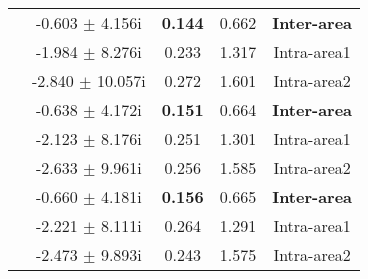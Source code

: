 \documentclass[conference,11pt]{IEEEtran}
\begin{document}
\begin{table}[t]
\begin{tabular}{||c|c|c|c|c||}
{}       &      {}     &         {} &      {}     &       {} \\ \hline
\hline
\multirow{3}{*}{\centering {10\%WG}}    &-0.603	$\pm$ 4.156i&	\bf{0.144}&	0.662& \bf{Inter-area}\\ 
{}                           &-1.984	$\pm$ 8.276i&	0.233&	1.317& Intra-area1\\
{}                            &-2.840	$\pm$ 10.057i&	0.272&	1.601& Intra-area2\\ \hline
\multirow{3}{*}{\centering {25\%WG}}    &-0.638	$\pm$ 4.172i&	\bf{0.151}&	0.664& \bf{Inter-area}\\ 
{}                            &-2.123	$\pm$ 8.176i&	0.251&	1.301& Intra-area1\\
{}                           &-2.633	$\pm$ 9.961i&	0.256&	1.585& Intra-area2\\ \hline
\multirow{3}{*}{\centering {35\%WG}}    &-0.660	$\pm$ 4.181i&	\bf{0.156}&	0.665& \bf{Inter-area}\\
{}                           &-2.221	$\pm$ 8.111i&	0.264&	1.291& Intra-area1\\
{}                         &-2.473	$\pm$ 9.893i&	0.243&	1.575&  Intra-area2\\ \hline
\hline
\end{tabular}
\vspace{-0.20in}
\end{table}
\end{document}
